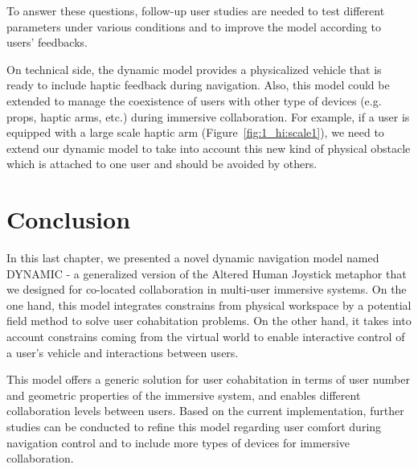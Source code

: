To answer these questions, follow-up user studies are needed to test different parameters under various conditions and to improve the model according to users' feedbacks.

On technical side, the dynamic model provides a physicalized vehicle that is ready to include haptic feedback during navigation. Also, this model could be extended to manage the coexistence of users with other type of devices (e.g. props, haptic arms, etc.) during immersive collaboration. For example, if a user is equipped with a large scale haptic arm (Figure~\ref{fig:1_hi:scale1}), we need to extend our dynamic model to take into account this new kind of physical obstacle which is attached to one user and should be avoided by others.


\section{Conclusion}
In this last chapter, we presented a novel dynamic navigation model named DYNAMIC - a generalized version of the Altered Human Joystick metaphor that we designed for co-located collaboration in multi-user immersive systems. On the one hand, this model integrates constrains from physical workspace by a potential field method to solve user cohabitation problems. On the other hand, it takes into account constrains coming from the virtual world to enable interactive control of a user's vehicle and interactions between users.

This model offers a generic solution for user cohabitation in terms of user number and geometric properties of the immersive system, and enables different collaboration levels between users. Based on the current implementation, further studies can be conducted to refine this model regarding user comfort during navigation control and to include more types of devices for immersive collaboration.
